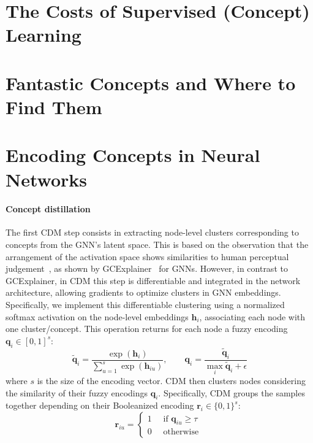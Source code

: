 \documentclass[withindex,glossary]{cam-thesis}
\theoremstyle{plain}
\theoremstyle{definition}
\theoremstyle{remark}
\begin{document}
\section{The Costs of Supervised (Concept) Learning}

\section{Fantastic Concepts and Where to Find Them}

\section{Encoding Concepts in Neural Networks}
\paragraph{Concept distillation}
The first CDM step consists in extracting node-level clusters corresponding to concepts from the GNN's latent space. This is based on the observation that the arrangement of the activation space shows similarities to human perceptual judgement~\citep{zhang2018unreasonable}, as shown by GCExplainer~\citep{magister2021gcexplainer} for GNNs. However, in contrast to GCExplainer, in CDM this step is differentiable and integrated in the network architecture, allowing gradients to optimize clusters in GNN embeddings. Specifically, we implement this differentiable clustering using a normalized softmax activation on the node-level embeddings $\mathbf{h}_i$, associating each node with one cluster/concept. This operation returns for each node a fuzzy encoding $\mathbf{q}_i \in [0,1]^s$:
\begin{equation} \label{eq:diffGCExp}
    \tilde{\mathbf{q}}_i = \frac{\exp({\mathbf{h}_i})}{\sum_{u=1}^s \exp(\mathbf{h}_{iu})}, \qquad \mathbf{q}_i = \frac{\tilde{\mathbf{q}}_i}{\max_i \tilde{\mathbf{q}}_i + \epsilon}
\end{equation}
where $s$ is the size of the encoding vector. CDM then clusters nodes considering the similarity of their fuzzy encodings $\mathbf{q}_i$. Specifically, CDM groups the samples together depending on their Booleanized encoding $\mathbf{r}_i \in \{0,1\}^s$:
\begin{equation}
    \mathbf{r}_{iu} = 
    \begin{cases}
    1 \quad \text{ if } \mathbf{q}_{iu} \geq \tau\\
    0 \quad \text{ otherwise }
    \end{cases}
\end{equation}
\end{document}
